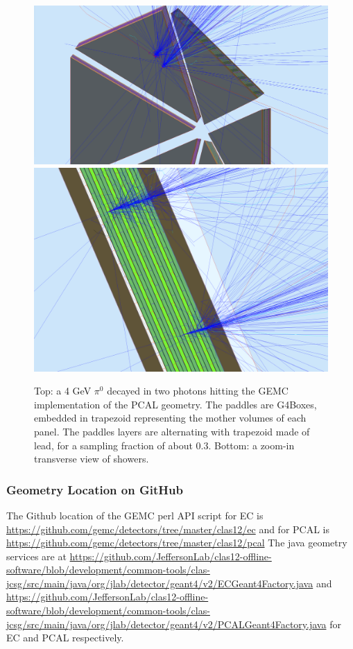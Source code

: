 \begin{figure}
	\centering
	\includegraphics[width=0.95\columnwidth,keepaspectratio]{img/pcalGeometry.png}
	\includegraphics[width=0.95\columnwidth,keepaspectratio]{img/pcalDetail.png}
	\caption{Top: a 4 GeV $\pi^0$ decayed in two photons hitting the GEMC implementation of the PCAL geometry.
            The paddles are G4Boxes, embedded in trapezoid representing the mother volumes of each panel.
            The paddles layers are alternating with trapezoid made of lead, for a sampling fraction of about 0.3.
            Bottom: a zoom-in transverse view of showers.}
	\label{fig:pcalGeometry}
\end{figure}




\subsubsection{Geometry Location on GitHub}
The Github location of the GEMC perl API script for EC  is \url{https://github.com/gemc/detectors/tree/master/clas12/ec} and
for PCAL is \url{https://github.com/gemc/detectors/tree/master/clas12/pcal}
The java geometry services are at 
\url{https://github.com/JeffersonLab/clas12-offline-software/blob/development/common-tools/clas-jcsg/src/main/java/org/jlab/detector/geant4/v2/ECGeant4Factory.java} and
\url{https://github.com/JeffersonLab/clas12-offline-software/blob/development/common-tools/clas-jcsg/src/main/java/org/jlab/detector/geant4/v2/PCALGeant4Factory.java} for
EC and PCAL respectively.



